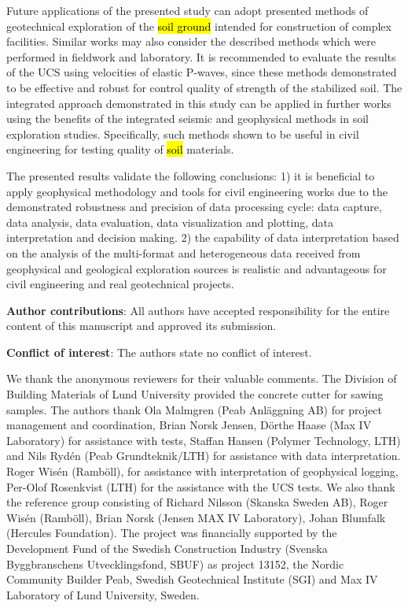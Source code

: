 \documentclass[USenglish,twocolumn]{article}
\begin{document}
Future applications of the presented study can adopt presented methods of geotechnical exploration of the \hl{soil ground} intended for construction of complex facilities. Similar works may also consider the described methods which were performed in fieldwork and laboratory. It is recommended to evaluate the results of the UCS using velocities of elastic P-waves, since these methods demonstrated to be effective and robust for control quality of strength of the stabilized soil. The integrated approach demonstrated in this study can be applied in further works using the benefits of the integrated seismic and geophysical methods in soil exploration studies. Specifically, such methods shown to be useful in civil engineering for testing quality of \hl{soil} materials.

The presented results validate the following conclusions: 1) it is beneficial to apply geophysical methodology and tools for civil engineering works due to the demonstrated robustness and precision of data processing cycle: data capture, data analysis, data evaluation, data visualization and plotting, data interpretation and decision making. 2) the capability of data interpretation based on the analysis of the multi-format and heterogeneous data received from geophysical and geological exploration sources is realistic and advantageous for civil engineering and real geotechnical projects.

\vspace{10pt}

\noindent
\textbf{Author contributions}: All authors have accepted responsibility for the entire content of this manuscript and approved its submission.

\vspace{10pt}

\noindent
\textbf{Conflict of interest}: The authors state no conflict of interest.

\begin{acknowledgement}
We thank the anonymous reviewers for their valuable comments. The Division of Building Materials of Lund University provided the concrete cutter for sawing samples. The authors thank Ola Malmgren (Peab Anläggning AB) for project management and coordination, Brian Norsk Jensen, Dörthe Haase (Max IV Laboratory) for assistance with tests, Staffan Hansen (Polymer Technology, LTH) and Nils Rydén (Peab Grundteknik/LTH) for assistance with data interpretation. Roger Wisén (Ramböll), for assistance with interpretation of geophysical logging, Per-Olof Rosenkvist (LTH) for the assistance with the UCS tests. We also thank the reference group consisting of Richard Nilsson (Skanska Sweden AB), Roger Wisén (Ramböll), Brian Norsk (Jensen MAX IV Laboratory), Johan Blumfalk (Hercules Foundation). The project was financially supported by the Development Fund of the Swedish Construction Industry (Svenska Byggbranschens Utvecklingsfond, SBUF) as project 13152, the Nordic Community Builder Peab, Swedish Geotechnical Institute (SGI) and Max IV Laboratory of Lund University, Sweden. 
\end{acknowledgement}

%


\end{document}
